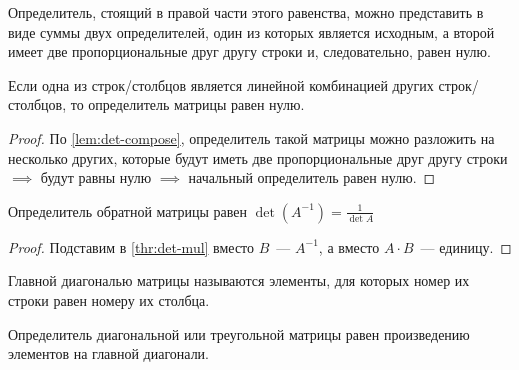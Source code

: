 Определитель, стоящий в правой части этого равенства, можно представить в виде
суммы двух определителей, один из которых является исходным, а второй имеет две
пропорциональные друг другу строки и, следовательно, равен нулю.

\begin{theorem}
  Если одна из строк/столбцов является линейной комбинацией других
  строк/столбцов, то определитель матрицы равен нулю.
\end{theorem}

\begin{proof}
   По \ref{lem:det-compose}, определитель такой матрицы можно разложить на
   несколько других, которые будут иметь две пропорциональные друг другу строки
  \(\implies\) будут равны нулю \(\implies\) начальный определитель равен нулю.
\end{proof}

\begin{theorem}
  Определитель обратной матрицы равен \(\det (A^{-1}) = \frac{1}{\det A}\)
\end{theorem}

\begin{proof}
  Подставим в \ref{thr:det-mul} вместо \(B\)~--- \(A^{-1}\), а вместо \(A \cdot
  B\)~--- единицу.
\end{proof}

\begin{definition}
  Главной диагональю матрицы называются элементы, для которых номер их строки
  равен номеру их столбца.
\end{definition}

\begin{theorem}
  Определитель диагональной или треугольной матрицы равен произведению элементов
  на главной диагонали.
\end{theorem}

